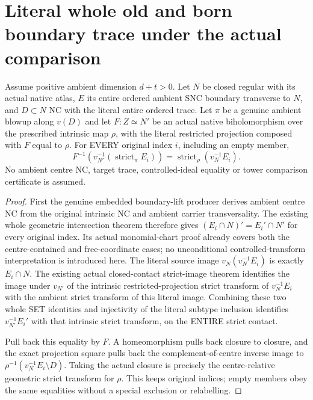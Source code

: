\section{Literal whole old and born boundary trace under the actual comparison}

\begin{theorem}
\label{hir:disjoint-every-original-strict-boundary-trace}
\leanok
Assume positive ambient dimension $d+t>0$. Let $N$ be closed regular with its actual native atlas, $E$ its entire ordered
ambient SNC boundary transverse to $N$, and $D\subset N$ NC with the literal
entire ordered trace. Let $\pi$ be a genuine ambient blowup along $v(D)$ and
let $F:Z\simeq N'$ be an actual native biholomorphism over the prescribed
intrinsic map $\rho$, with the literal restricted projection composed with
$F$ equal to $\rho$. For EVERY original index $i$, including an empty member,
\[
 F^{-1}(v_{N'}^{-1}(\operatorname{strict}_{\pi}E_i))
   =\operatorname{strict}_{\rho}(v_N^{-1}E_i).
\]
No ambient centre NC, target trace, controlled-ideal equality or tower
comparison certificate is assumed.
\end{theorem}
\begin{proof}
First the genuine embedded boundary-lift producer derives ambient centre NC
from the original intrinsic NC and ambient carrier transversality. The
existing whole geometric intersection theorem therefore gives
$(E_i\cap N)'=E_i'\cap N'$ for every original index. Its actual monomial-chart
proof already covers both the centre-contained and free-coordinate cases;
no unconditional controlled-transform interpretation is introduced here.
The literal source image $v_N(v_N^{-1}E_i)$ is exactly $E_i\cap N$.
The existing actual closed-contact strict-image theorem identifies the
image under $v_{N'}$ of the intrinsic restricted-projection strict transform
of $v_N^{-1}E_i$ with the ambient strict transform of this literal image.
Combining these two whole SET identities and injectivity of the literal
subtype inclusion identifies $v_{N'}^{-1}E_i'$ with that intrinsic strict
transform, on the ENTIRE strict contact.

Pull back this equality by $F$. A homeomorphism pulls back closure to closure,
and the exact projection square pulls back the complement-of-centre inverse
image to $\rho^{-1}(v_N^{-1}E_i\setminus D)$. Taking the actual closure is
precisely the centre-relative geometric strict transform for $\rho$. This
keeps original indices; empty members obey the same equalities without a
special exclusion or relabelling.
\end{proof}


